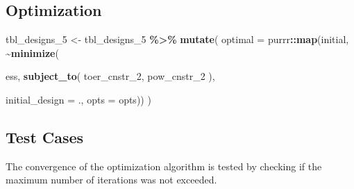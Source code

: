 \documentclass[
]{book}
\newenvironment{Shaded}{\begin{snugshade}}{\end{snugshade}}
\newcommand{\DataTypeTok}[1]{\textcolor[rgb]{0.13,0.29,0.53}{#1}}
\newcommand{\DecValTok}[1]{\textcolor[rgb]{0.00,0.00,0.81}{#1}}
\newcommand{\KeywordTok}[1]{\textcolor[rgb]{0.13,0.29,0.53}{\textbf{#1}}}
\newcommand{\NormalTok}[1]{#1}
\newcommand{\OperatorTok}[1]{\textcolor[rgb]{0.81,0.36,0.00}{\textbf{#1}}}
\newcommand{\StringTok}[1]{\textcolor[rgb]{0.31,0.60,0.02}{#1}}
\begin{document}
\hypertarget{optimization-8}{%
\subsection{Optimization}\label{optimization-8}}

\begin{Shaded}
\begin{Highlighting}[]
\NormalTok{tbl\_designs\_}\DecValTok{5}\NormalTok{ \textless{}{-}}\StringTok{ }\NormalTok{tbl\_designs\_}\DecValTok{5} \OperatorTok{\%\textgreater{}\%}\StringTok{ }
\StringTok{    }\KeywordTok{mutate}\NormalTok{(}
       \DataTypeTok{optimal =}\NormalTok{ purrr}\OperatorTok{::}\KeywordTok{map}\NormalTok{(initial, }\OperatorTok{\textasciitilde{}}\KeywordTok{minimize}\NormalTok{(}
         
\NormalTok{          ess,}
          \KeywordTok{subject\_to}\NormalTok{(}
\NormalTok{              toer\_cnstr\_}\DecValTok{2}\NormalTok{,}
\NormalTok{              pow\_cnstr\_}\DecValTok{2}
\NormalTok{          ),}
          
          \DataTypeTok{initial\_design =}\NormalTok{ ., }
          \DataTypeTok{opts           =}\NormalTok{ opts)) )}
\end{Highlighting}
\end{Shaded}

\hypertarget{test-cases-9}{%
\subsection{Test Cases}\label{test-cases-9}}

The convergence of the optimization algorithm is tested by checking if the
maximum number of iterations was not exceeded.

\begin{Shaded}
\end{Shaded}
\end{document}
